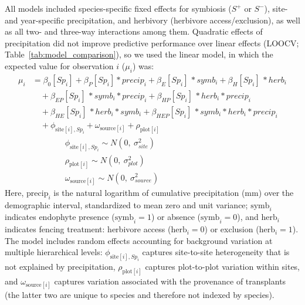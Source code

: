 \documentclass[12pt]{article}\usepackage[]{graphicx}\usepackage[dvipsnames]{xcolor}
\begin{document}
All models included species-specific fixed effects for symbiosis ($S^+$ or $S^-$), site- and year-specific precipitation, and herbivory (herbivore access/exclusion), as well as all two- and three-way interactions among them.
Quadratic effects of precipitation did not improve predictive performance over linear effects (LOOCV; Table~\ref{tab:model_comparison}), so we used the linear model, in which the expected value for observation $i$ ($\mu_{i}$) was:
\begin{equation}\label{eq:full_model}
\begin{aligned}
\mu_i &= \beta_0[Sp_i] + \beta_P[Sp_i] * precip_i + \beta_{E}[Sp_i]\, * symb_i + \beta_{H}[Sp_i]\, * herb_i \\
&\quad + \beta_{EP}[Sp_i]\, * symb_i * precip_i 
       + \beta_{HP}[Sp_i]\, * herb_i * precip_i \\
&\quad + \beta_{HE}[Sp_i]\, * herb_i * symb_i + \beta_{HEP}[Sp_i]\, *symb_i * herb_i * precip_i \\
&\quad  + \phi_{\text{site}[i],Sp_i} 
       + \omega_{\text{source}[i]} 
       + \rho_{\text{plot}[i]}
       \\
&\quad \quad \quad \quad \phi_{\text{site}[i],Sp_i} \sim N(0,\ \sigma^2_{site})\\
&\quad \quad \quad \quad \rho_{\text{plot}[i]} \sim N(0,\ \sigma^2_{plot})\\
&\quad \quad \quad \quad \omega_{\text{source}[i]} \sim N(0,\ \sigma^2_{source})
\end{aligned}
\end{equation}
Here, $\mathrm{precip}_i$ is the natural logarithm of cumulative precipitation (mm) over the demographic interval, standardized to mean zero and unit variance; $\mathrm{symb}_i$ indicates endophyte presence ($\mathrm{symb}_i = 1$) or absence ($\mathrm{symb}_i = 0$), and $\mathrm{herb}_i$ indicates fencing treatment: herbivore access ($\mathrm{herb}_i = 0$) or exclusion ($\mathrm{herb}_i = 1$).
The model includes random effects accounting for background variation at multiple hierarchical levels: $\phi_{\text{site}[i],Sp_i}$ captures site-to-site heterogeneity that is not explained by precipitation, $\rho_{\text{plot}[i]}$ captures plot-to-plot variation within sites, and $\omega_{\text{source}[i]}$ captures variation associated with the provenance of transplants (the latter two are unique to species and therefore not indexed by species).
\end{document}
